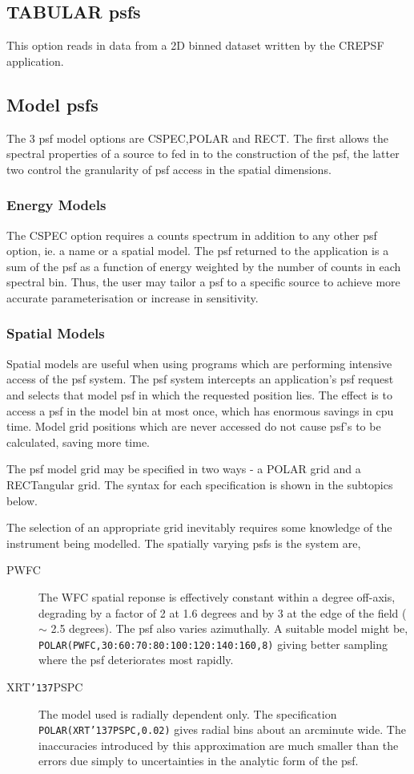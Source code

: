 \documentclass{book}
\renewcommand{\_}{{\tt\char'137}}     %
\begin{document}
\subsection{TABULAR psfs}
This option reads in data from a 2D binned dataset written by
the CREPSF application.

\subsection{Model psfs}
The 3 psf model options are CSPEC,POLAR and RECT. The first allows
the spectral properties of a source to fed in to the construction
of the psf, the latter two control the granularity of psf access in
the spatial dimensions.

\subsubsection{Energy Models}
The CSPEC option requires a counts spectrum in addition to any
other psf option, ie. a name or a spatial model. The psf returned
to the application is a sum of the psf as a function of energy
weighted by the number of counts in each spectral bin. Thus, the
user may tailor a psf to a specific source to achieve more
accurate parameterisation or increase in sensitivity.

\subsubsection{Spatial Models}
Spatial models are useful when using programs which are performing
intensive access of the psf system. The psf system intercepts an
application's psf request and selects that model psf in which the
requested position lies. The effect is to access a psf in the model
bin at most once, which has enormous savings in cpu time. Model
grid positions which are never accessed do not cause psf's to be
calculated, saving more time.

The psf model grid may be specified in two ways - a POLAR grid
and a RECTangular grid. The syntax for each specification is
shown in the subtopics below.

The selection of an appropriate grid inevitably requires some
knowledge of the instrument being modelled. The spatially
varying psfs is the system are,


\begin{description}
\item[PWFC]
The WFC spatial reponse is effectively constant
within a degree off-axis, degrading by a factor
of 2 at 1.6 degrees and by 3 at the edge of the
field ($\sim$ 2.5 degrees). The psf also varies
azimuthally. A suitable model might be,
{\tt POLAR(PWFC,30:60:70:80:100:120:140:160,8)}
giving better sampling where the psf deteriorates
most rapidly.
\item[XRT\_PSPC]
The model used is radially dependent only. The
specification {\tt POLAR(XRT\_PSPC,0.02)}
gives radial bins about an arcminute wide.
The inaccuracies introduced by this approximation
are much smaller than the errors due simply to
uncertainties in the analytic form of the psf.
\end{description}
\end{document}
